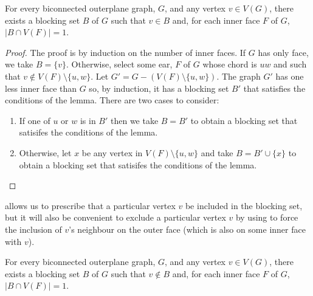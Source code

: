 \documentclass{patmorin}
\begin{document}


\begin{lem}
  For every biconnected outerplane graph, $G$, and any vertex $v\in
  V(G)$, there exists a blocking set $B$ of $G$ such that $v\in B$ and,
  for each inner face $F$ of $G$, $|B\cap V(F)|=1$.
\end{lem}

\begin{proof}
  The proof is by induction on the number of inner faces.  If $G$ has
  only face, we take $B=\{v\}$.  Otherwise, select some ear, $F$ of $G$
  whose chord is $uw$ and such that $v\not\in V(F)\setminus\{u,w\}$.
  Let $G'=G-(V(F)\setminus\{u,w\})$.  The graph $G'$ has one less inner
  face than $G$ so, by induction, it has a blocking set $B'$ that satisfies
  the conditions of the lemma.  There are two cases to consider:
  \begin{enumerate}
    \item If one of $u$ or $w$ is in $B'$ then we take $B=B'$ to obtain
      a blocking set that satisifes the conditions of the lemma.

    \item Otherwise, let $x$ be any vertex in $V(F)\setminus\{u,w\}$ and
      take $B=B'\cup\{x\}$ to obtain a blocking set that satisifes the
      conditions of the lemma. \qedhere
  \end{enumerate}
\end{proof}

 allows us to prescribe that a particular vertex
$v$ be included in the blocking set, but it will also be convenient to
exclude a particular vertex $v$ by using  to force
the inclusion of $v$'s neighbour on the outer face (which is also on
some inner face with $v$).

\begin{cor}
  For every biconnected outerplane graph, $G$, and any vertex $v\in
  V(G)$, there exists a blocking set $B$ of $G$ such that $v\not\in B$ and,
  for each inner face $F$ of $G$, $|B\cap V(F)|=1$.
\end{cor}
\end{document}
